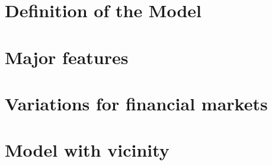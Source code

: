 \section{Definition of the Model}
\label{minority:definition}

\section{Major features}
\label{miinority:majorfeatures}

\section{Variations for financial markets}
\label{minority:variations}

\section{Model with vicinity}
\label{minority:vicinity}
